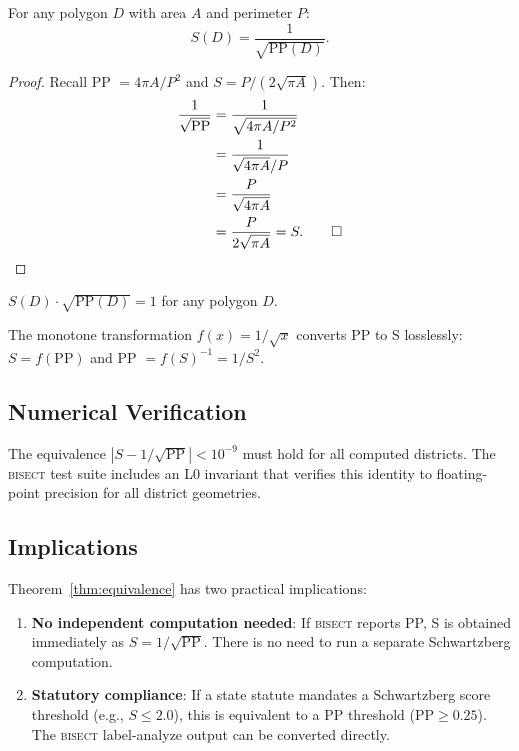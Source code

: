 \begin{theorem}[$S = 1/\sqrt{\text{PP}}$]
  \label{thm:equivalence}
  For any polygon $D$ with area $A$ and perimeter $P$:
  \begin{equation}
    S(D) = \frac{1}{\sqrt{\text{PP}(D)}}.
    \label{eq:equivalence}
  \end{equation}
\end{theorem}

\begin{proof}
  Recall PP $= 4\pi A / P^2$ and $S = P / (2\sqrt{\pi A})$.
  Then:
  \begin{align}
    \frac{1}{\sqrt{\text{PP}}} &= \frac{1}{\sqrt{4\pi A / P^2}} \\
    &= \frac{1}{\sqrt{4\pi A} / P} \\
    &= \frac{P}{\sqrt{4\pi A}} \\
    &= \frac{P}{2\sqrt{\pi A}} = S. \qed
  \end{align}
\end{proof}

\begin{corollary}
  $S(D) \cdot \sqrt{\text{PP}(D)} = 1$ for any polygon $D$.
\end{corollary}

\begin{corollary}
  The monotone transformation $f(x) = 1/\sqrt{x}$ converts PP to S losslessly:
  $S = f(\text{PP})$ and PP $= f(S)^{-1} = 1/S^2$.
\end{corollary}

\subsection{Numerical Verification}

The equivalence $|S - 1/\sqrt{\text{PP}}| < 10^{-9}$ must hold for all
computed districts.
The \textsc{bisect} test suite includes an L0 invariant that verifies this
identity to floating-point precision for all district geometries.

\subsection{Implications}

Theorem~\ref{thm:equivalence} has two practical implications:
\begin{enumerate}
  \item \textbf{No independent computation needed}: If \textsc{bisect} reports PP,
    S is obtained immediately as $S = 1/\sqrt{\text{PP}}$.
    There is no need to run a separate Schwartzberg computation.
  \item \textbf{Statutory compliance}: If a state statute mandates a
    Schwartzberg score threshold (e.g., $S \leq 2.0$), this is equivalent to
    a PP threshold ($\text{PP} \geq 0.25$).
    The \textsc{bisect} label-analyze output can be converted directly.
\end{enumerate}
